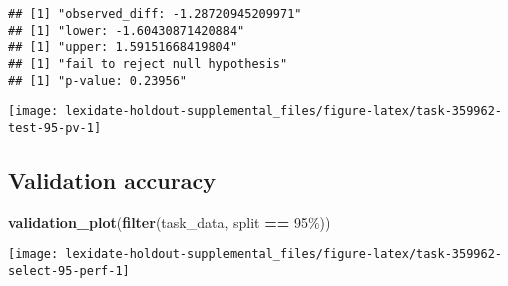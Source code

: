 \documentclass[
]{book}
\newenvironment{Shaded}{\begin{snugshade}}{\end{snugshade}}
\newcommand{\AttributeTok}[1]{\textcolor[rgb]{0.13,0.29,0.53}{#1}}
\newcommand{\DecValTok}[1]{\textcolor[rgb]{0.00,0.00,0.81}{#1}}
\newcommand{\FunctionTok}[1]{\textcolor[rgb]{0.13,0.29,0.53}{\textbf{#1}}}
\newcommand{\NormalTok}[1]{#1}
\newcommand{\OtherTok}[1]{\textcolor[rgb]{0.56,0.35,0.01}{#1}}
\newcommand{\SpecialCharTok}[1]{\textcolor[rgb]{0.81,0.36,0.00}{\textbf{#1}}}
\newcommand{\StringTok}[1]{\textcolor[rgb]{0.31,0.60,0.02}{#1}}
\begin{document}
\begin{Shaded}
\end{Shaded}

\begin{verbatim}
## [1] "observed_diff: -1.28720945209971"
## [1] "lower: -1.60430871420884"
## [1] "upper: 1.59151668419804"
## [1] "fail to reject null hypothesis"
## [1] "p-value: 0.23956"
\end{verbatim}

\texttt{[image: lexidate-holdout-supplemental\_files/figure-latex/task-359962-test-95-pv-1]}

\hypertarget{validation-accuracy-59}{%
\subsection{Validation accuracy}\label{validation-accuracy-59}}

\begin{Shaded}
\begin{Highlighting}[]
\FunctionTok{validation\_plot}\NormalTok{(}\FunctionTok{filter}\NormalTok{(task\_data, split }\SpecialCharTok{==} \StringTok{\textquotesingle{}95\%\textquotesingle{}}\NormalTok{))}
\end{Highlighting}
\end{Shaded}

\texttt{[image: lexidate-holdout-supplemental\_files/figure-latex/task-359962-select-95-perf-1]}
\end{document}
